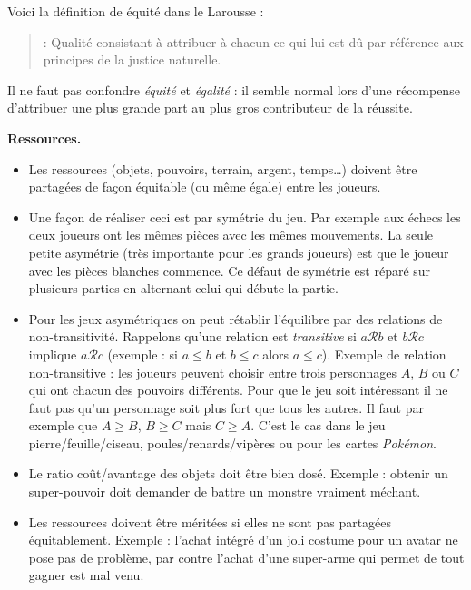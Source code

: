 \documentclass[11pt,class=report,crop=false]{standalone}
\begin{document}
Voici la définition de \og{}équité\fg{} dans le Larousse :
\begin{quote}
	 : Qualité consistant à attribuer à chacun ce qui lui est dû par référence aux principes de la justice naturelle. 
\end{quote}	
Il ne faut pas confondre \emph{équité} et \emph{égalité} : il semble normal lors d'une récompense d'attribuer une plus grande part au plus gros contributeur de la réussite.

\medskip

\textbf{Ressources.}

\begin{itemize}
	\item Les ressources (objets, pouvoirs, terrain, argent, temps\ldots) doivent être partagées de façon équitable (ou même égale) entre les joueurs.
	
	\item Une façon de réaliser ceci est par symétrie du jeu. Par exemple aux échecs les deux joueurs ont les mêmes pièces avec les mêmes mouvements. La seule petite asymétrie (très importante pour les grands joueurs) est que le joueur avec les pièces blanches commence. Ce défaut de symétrie est réparé sur plusieurs parties en alternant celui qui débute la partie.
	
	\item Pour les jeux asymétriques on peut rétablir l'équilibre par des relations de non-transitivité.
	Rappelons qu'une relation est \emph{transitive} si $a\mathcal{R}b$ et $b\mathcal{R}c$ implique $a\mathcal{R}c$ (exemple : si $a\le b$ et $b\le c$ alors $a\le c$). Exemple de relation non-transitive : les joueurs peuvent choisir entre  trois personnages $A$, $B$ ou $C$ qui ont chacun des pouvoirs différents. Pour que le jeu soit intéressant il ne faut pas qu'un personnage soit plus fort que tous les autres. Il faut par exemple que $A \ge B$, $B \ge C$ mais $C \ge A$. C'est le cas dans le jeu \og{}pierre/feuille/ciseau\fg{}, \og{}poules/renards/vipères\fg{} ou pour les cartes \emph{Pokémon}.
	
	\item Le ratio coût/avantage des objets doit être bien dosé. Exemple : obtenir un super-pouvoir doit demander de battre un monstre vraiment méchant. 
	
	\item Les ressources doivent être méritées si elles ne sont pas partagées équitablement. Exemple : l'achat intégré d'un joli costume pour un avatar ne pose pas de problème, par contre l'achat d'une super-arme qui permet de tout gagner est mal venu.
\end{itemize}
\end{document}
